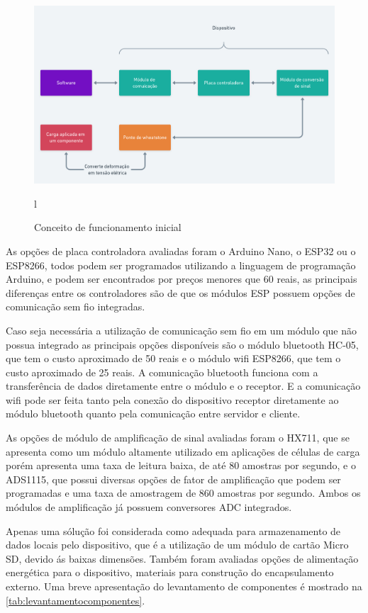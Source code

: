 \begin{figure}[htb]
	\caption{\label{fig:2035} Conceito de funcionamento inicial}
	\begin{center}
		\includegraphics[width=\textwidth]{pictures/2035.png}
	\end{center}l
\end{figure}

As opções de placa controladora avaliadas foram o Arduino Nano, o ESP32 ou o ESP8266, todos podem ser programados utilizando a linguagem de programação Arduino, e podem ser
encontrados por preços menores que 60 reais, as principais diferenças entre os controladores são de que os módulos ESP possuem opções de comunicação sem fio integradas.

Caso seja necessária a utilização de comunicação sem fio em um módulo que não possua integrado as principais opções disponíveis são o módulo bluetooth HC-05, que tem o custo
aproximado de 50 reais e o módulo wifi ESP8266, que tem o custo aproximado de 25 reais. A comunicação bluetooth funciona com a transferência de dados diretamente entre o módulo e o receptor. E a comunicação wifi pode ser feita tanto pela conexão do dispositivo receptor diretamente ao módulo bluetooth quanto pela comunicação entre servidor e cliente.

As opções de módulo de amplificação de sinal avaliadas foram o HX711, que se apresenta como um módulo altamente utilizado em aplicações de células de carga porém apresenta
uma taxa de leitura baixa, de até 80 amostras por segundo, e o ADS1115, que possui diversas opções de fator de amplificação que podem ser programadas e uma taxa de amostragem de 860 amostras por segundo. Ambos os módulos de amplificação já possuem conversores ADC integrados.

Apenas uma sólução foi considerada como adequada para armazenamento de dados locais pelo dispositivo, que é a utilização de um módulo de cartão Micro SD, devido
ás baixas dimensões. Também foram avaliadas opções de alimentação energética para o dispositivo, materiais para construção do encapsulamento externo.
Uma breve apresentação do levantamento de componentes é mostrado na \autoref{tab:levantamentocomponentes}.

